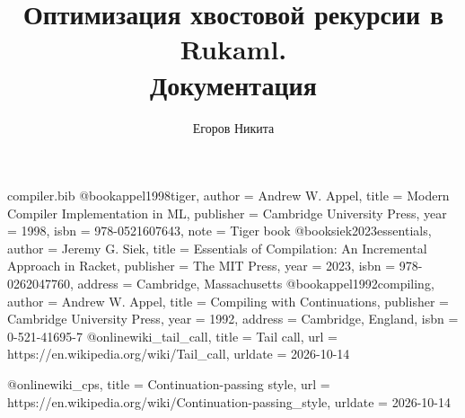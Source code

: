\begin{filecontents}[overwrite]{compiler.bib}
@book{appel1998tiger,
	author    = {Andrew W. Appel},
	title     = {Modern Compiler Implementation in ML},
	publisher = {Cambridge University Press},
	year      = {1998},
	isbn      = {978-0521607643},
	note      = {Tiger book}
}
@book{siek2023essentials,
	author    = {Jeremy G. Siek},
	title     = {Essentials of Compilation: An Incremental Approach in Racket},
	publisher = {The MIT Press},
	year      = {2023},
	isbn      = {978-0262047760},
	address   = {Cambridge, Massachusetts}
}
@book{appel1992compiling,
	author    = {Andrew W. Appel},
	title     = {Compiling with Continuations},
	publisher = {Cambridge University Press},
	year      = {1992},
	address   = {Cambridge, England},
	isbn      = {0-521-41695-7}
}
@online{wiki_tail_call,
	title   = {Tail call},
	url     = {https://en.wikipedia.org/wiki/Tail_call},
	urldate = {2026-10-14}
}

@online{wiki_cps,
	title   = {Continuation-passing style},
	url     = {https://en.wikipedia.org/wiki/Continuation-passing_style},
	urldate = {2026-10-14}
}
\end{filecontents}

\documentclass{article}
\usepackage{fontspec}%
\usepackage{blindtext}
\usepackage{polyglossia}
\usepackage{hyperref}

\usepackage{listings}
\usepackage{caption}
\usepackage[a4paper, left=3cm, top=1.5cm, right=3cm]{geometry}

\usepackage[style=authoryear, dashed=false]{biblatex}


\setdefaultlanguage{russian}

\setmainfont{Source Sans 3}
\setsansfont{Source Sans 3}
\setmonofont[Scale=0.9]{Roboto Mono}

\renewcommand{\lstlistingname}{Пример}
\captionsetup[lstlisting]{
	justification=centering,
	singlelinecheck=false
}

\title{Оптимизация хвостовой рекурсии в Rukaml.\\Документация}
\author{Егоров Никита}
\date{}

	
	\maketitle
	\tableofcontents
	
	\section{Введение}
	
